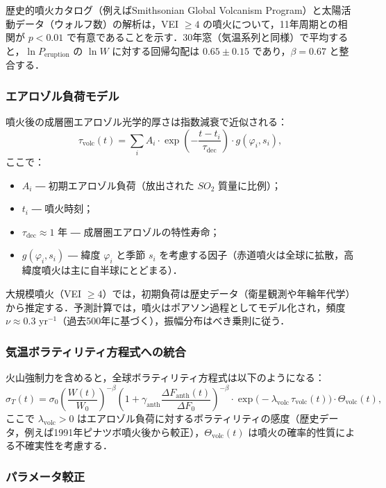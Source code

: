 \documentclass[11pt,a4paper]{article}
\begin{document}
	歴史的噴火カタログ（例えばSmithsonian Global Volcanism Program）と太陽活動データ（ウォルフ数）の解析は，VEI $\ge 4$ の噴火について，11年周期との相関が $p < 0.01$ で有意であることを示す．30年窓（気温系列と同様）で平均すると，$\ln P_{\text{eruption}}$ の $\ln W$ に対する回帰勾配は $0.65 \pm 0.15$ であり，$\beta = 0.67$ と整合する．
	
	\subsubsection{エアロゾル負荷モデル}
	
	噴火後の成層圏エアロゾル光学的厚さは指数減衰で近似される：
	\[
	\tau_{\text{volc}}(t) = \sum_{i} A_i \cdot \exp\!\left(-\frac{t-t_i}{\tau_{\text{dec}}}\right) \cdot g(\varphi_i, s_i),
	\]
	ここで：
	\begin{itemize}
		\item $A_i$ ― 初期エアロゾル負荷（放出された $SO_2$ 質量に比例）；
		\item $t_i$ ― 噴火時刻；
		\item $\tau_{\text{dec}} \approx 1$ 年 ― 成層圏エアロゾルの特性寿命；
		\item $g(\varphi_i, s_i)$ ― 緯度 $\varphi_i$ と季節 $s_i$ を考慮する因子（赤道噴火は全球に拡散，高緯度噴火は主に自半球にとどまる）．
	\end{itemize}
	
	大規模噴火（VEI $\ge 4$）では，初期負荷は歴史データ（衛星観測や年輪年代学）から推定する．予測計算では，噴火はポアソン過程としてモデル化され，頻度 $\nu \approx 0.3$ yr$^{-1}$（過去500年に基づく），振幅分布はべき乗則に従う．
	
	\subsubsection{気温ボラティリティ方程式への統合}
	
	火山強制力を含めると，全球ボラティリティ方程式は以下のようになる：
	\[
	\sigma_T(t) = \sigma_0 \left( \frac{W(t)}{W_0} \right)^{-\beta}
	\left(1 + \gamma_{\text{anth}} \frac{\Delta F_{\text{anth}}(t)}{\Delta F_0}\right)^{-\beta}
	\cdot \exp\!\bigl(-\lambda_{\text{volc}} \,\tau_{\text{volc}}(t)\bigr) \cdot \Theta_{\text{volc}}(t),
	\]
	ここで $\lambda_{\text{volc}} > 0$ はエアロゾル負荷に対するボラティリティの感度（歴史データ，例えば1991年ピナツボ噴火後から較正），$\Theta_{\text{volc}}(t)$ は噴火の確率的性質による不確実性を考慮する．
	
	\subsubsection{パラメータ較正}
	
\end{document}
